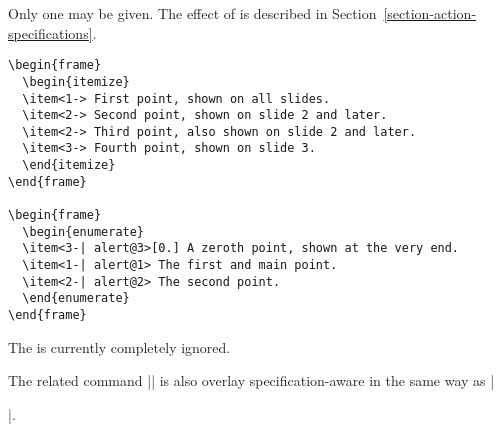 \begin{command}{\item{}}
  \beamernote
  Only one  may be given. The effect of  is described in Section~\ref{section-action-specifications}.

  \example
\begin{verbatim}
\begin{frame}
  \begin{itemize}
  \item<1-> First point, shown on all slides.
  \item<2-> Second point, shown on slide 2 and later.
  \item<2-> Third point, also shown on slide 2 and later.
  \item<3-> Fourth point, shown on slide 3.
  \end{itemize}
\end{frame}

\begin{frame}
  \begin{enumerate}
  \item<3-| alert@3>[0.] A zeroth point, shown at the very end.
  \item<1-| alert@1> The first and main point.
  \item<2-| alert@2> The second point.
  \end{enumerate}
\end{frame}
\end{verbatim}

  \articlenote
  The  is currently completely ignored.

\end{command}

The related command |\bibitem| is also overlay specification-aware in the same way as |\item|.

